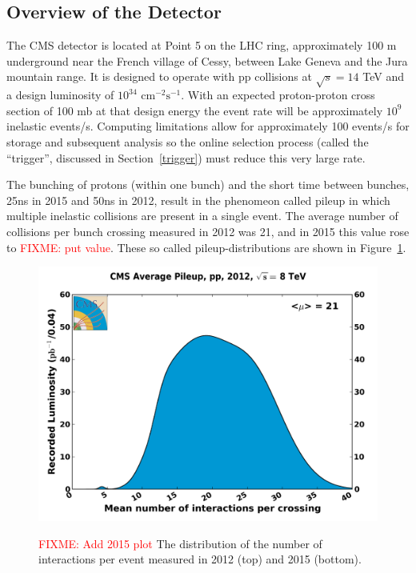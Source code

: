 \subsection{Overview of the Detector}

The CMS detector is located at Point 5 on the LHC ring, approximately 100 m underground near the French village of Cessy, between Lake Geneva and the Jura mountain range.  It is designed to operate with pp collisions at $\sqrt{s} = 14$ TeV and a design luminosity of $10^{34}\text{ cm}^{-2}\text{s}^{-1}$.  With an expected proton-proton cross section of 100 mb at that design energy the event rate will be approximately $10^9$ inelastic events/s.  Computing limitations allow for approximately 100 events/s for storage and subsequent analysis so the online selection process (called the ``trigger'', discussed in Section~\ref{trigger}) must reduce this very large rate.  

The bunching of protons (within one bunch) and the short time between bunches, 25ns in 2015 and 50ns in 2012, result in the phenomeon called pileup in which multiple inelastic collisions are present in a single event.  The average number of collisions per bunch crossing measured in 2012 was 21, and in 2015 this value rose to \textcolor{red}{FIXME: put value}.  These so called pileup-distributions are shown in Figure~\ref{figapp:CMSpileup}.



\begin{figure}[!Hh]
       \centering
       \includegraphics[scale=0.5]{Figures/pileup_pp_2012.png} \\
       \caption[Distribution of number of collisions per bunch crossing in 2012 and 2015.]{\textcolor{red}{FIXME: Add 2015 plot} The distribution of the number of interactions per event measured in 2012 (top) and 2015 (bottom).}
\label{figapp:CMSpileup}
\end{figure}


